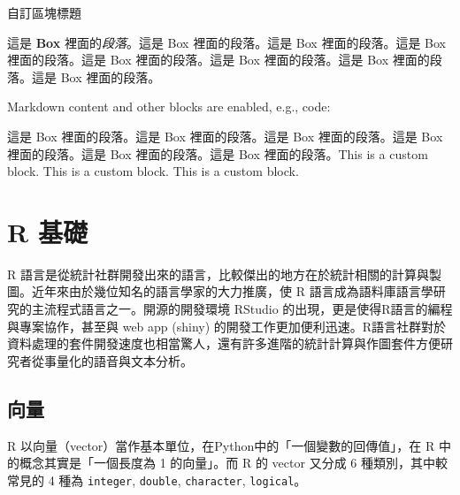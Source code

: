 \begin{mybox}{自訂區塊標題}

這是 \textbf{Box} 裡面的\emph{段落}。這是 Box 裡面的段落。這是 Box
裡面的段落。這是 Box 裡面的段落。這是 Box 裡面的段落。這是 Box
裡面的段落。這是 Box 裡面的段落。這是 Box 裡面的段落。

Markdown content and other blocks are enabled, e.g., code:

\begin{Shaded}
\begin{Highlighting}[]
\NormalTok{(}\NormalTok{)}
\end{Highlighting}
\end{Shaded}

這是 Box 裡面的段落。這是 Box 裡面的段落。這是 Box 裡面的段落。這是 Box
裡面的段落。這是 Box 裡面的段落。這是 Box 裡面的段落。This is a custom
block. This is a custom block. This is a custom block.

\end{mybox}

\appendix

\hypertarget{r-ux57faux790e}{%
\chapter{R 基礎}\label{r-ux57faux790e}}

R
語言是從統計社群開發出來的語言，比較傑出的地方在於統計相關的計算與製圖。近年來由於幾位知名的語言學家的大力推廣，使
R 語言成為語料庫語言學研究的主流程式語言之一。開源的開發環境 RStudio
的出現，更是使得R語言的編程與專案協作，甚至與 web app (shiny)
的開發工作更加便利迅速。R語言社群對於資料處理的套件開發速度也相當驚人，還有許多進階的統計計算與作圖套件方便研究者從事量化的語音與文本分析。

\hypertarget{ux5411ux91cf}{%
\section{向量}\label{ux5411ux91cf}}

R 以向量（vector）當作基本單位，在Python中的「一個變數的回傳值」，在 R
中的概念其實是「一個長度為 1 的向量」。而 R 的 vector 又分成 6
種類別，其中較常見的 4 種為 \texttt{integer}, \texttt{double},
\texttt{character}, \texttt{logical}。

